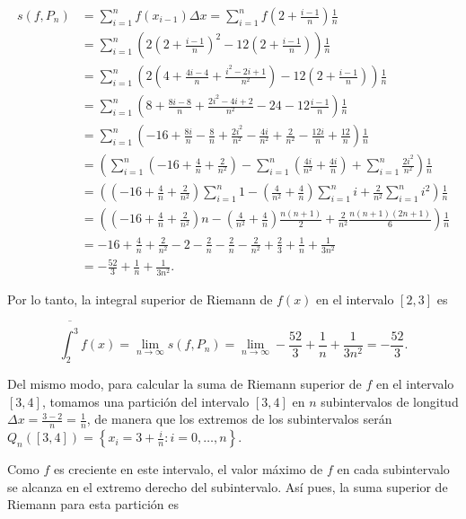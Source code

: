 \documentclass[
  a4paper,
]{scrreport}
\theoremstyle{definition}
\theoremstyle{remark}
\begin{document}
\begin{tcolorbox}
\begin{align*}
s(f,P_n) 
&= \sum_{i=1}^{n} f(x_{i-1}) \Delta x = \sum_{i=1}^{n} f\left(2 + \frac{i-1}{n}\right) \frac{1}{n} \\
&= \sum_{i=1}^{n} \left(2\left(2 + \frac{i-1}{n}\right)^2 - 12\left(2 + \frac{i-1}{n}\right)\right) \frac{1}{n} \\
&= \sum_{i=1}^{n} \left(2\left(4 + \frac{4i-4}{n} + \frac{i^2-2i+1}{n^2}\right) - 12\left(2 + \frac{i-1}{n}\right)\right) \frac{1}{n} \\
&= \sum_{i=1}^{n} \left(8 + \frac{8i-8}{n} + \frac{2i^2-4i+2}{n^2} - 24 - 12\frac{i-1}{n}\right) \frac{1}{n} \\
&= \sum_{i=1}^{n} \left(-16 + \frac{8i}{n}-\frac{8}{n} + \frac{2i^2}{n^2}-\frac{4i}{n^2}+\frac{2}{n^2} - \frac{12i}{n}+\frac{12}{n}\right) \frac{1}{n} \\
&= \left(\sum_{i=1}^{n} \left(-16 + \frac{4}{n} + \frac{2}{n^2}\right) - \sum_{i=1}^n \left(\frac{4i}{n^2} + \frac{4i}{n}\right) + \sum_{i=1}^n \frac{2i^2}{n^2} \right) \frac{1}{n} \\
&= \left(\left(-16 + \frac{4}{n} + \frac{2}{n^2}\right)\sum_{i=1}^{n} 1 - \left(\frac{4}{n^2} + \frac{4}{n}\right) \sum_{i=1}^n i +  \frac{2}{n^2} \sum_{i=1}^n i^2 \right) \frac{1}{n} \\
&= \left(\left(-16 + \frac{4}{n} + \frac{2}{n^2}\right)n - \left(\frac{4}{n^2} + \frac{4}{n}\right) \frac{n(n+1)}{2} +  \frac{2}{n^2} \frac{n(n+1)(2n+1)}{6} \right) \frac{1}{n}\\
&= -16 + \frac{4}{n} + \frac{2}{n^2} - 2 - \frac{2}{n} - \frac{2}{n} - \frac{2}{n^2} + \frac{2}{3} +  \frac{1}{n} + \frac{1}{3n^2} \\
&= -\frac{52}{3} + \frac{1}{n} + \frac{1}{3n^2}.
\end{align*}

Por lo tanto, la integral superior de Riemann de \(f(x)\) en el
intervalo \([2, 3]\) es

\[
\overline{\int_2^3} f(x) 
= \lim_{n \to \infty} s(f,P_n) 
= \lim_{n \to \infty} -\frac{52}{3} + \frac{1}{n} + \frac{1}{3n^2}
= -\frac{52}{3}.
\]

Del mismo modo, para calcular la suma de Riemann superior de \(f\) en el
intervalo \([3,4]\), tomamos una partición del intervalo \([3, 4]\) en
\(n\) subintervalos de longitud
\(\Delta x = \frac{3-2}{n} = \frac{1}{n}\), de manera que los extremos
de los subintervalos serán
\(Q_n([3,4]) = \left\{x_i = 3 + \frac{i}{n}: i = 0, \ldots, n\right\}\).

Como \(f\) es creciente en este intervalo, el valor máximo de \(f\) en
cada subintervalo se alcanza en el extremo derecho del subintervalo. Así
pues, la suma superior de Riemann para esta partición es


\end{tcolorbox}
\end{document}
